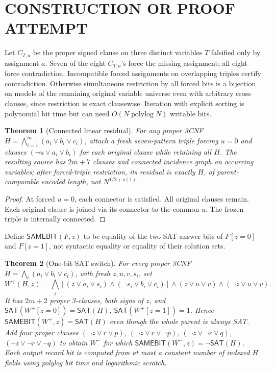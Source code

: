 \documentclass[11pt]{article}
\newtheorem{theorem}{Theorem}
\begin{document}
\section{CONSTRUCTION OR PROOF ATTEMPT}
Let \(C_{T,a}\) be the proper signed clause on three distinct variables \(T\) falsified only by assignment \(a\). Seven of the eight \(C_{T,a}\)'s force the missing assignment; all eight force contradiction. Incompatible forced assignments on overlapping triples certify contradiction. Otherwise simultaneous restriction by all forced bits is a bijection on models of the remaining original variable universe even with arbitrary cross clauses, since restriction is exact clausewise. Iteration with explicit sorting is polynomial bit time but can need \(O(N\operatorname{polylog}N)\) writable bits.
\begin{theorem}[Connected linear residual]
For any proper 3CNF \(H=\bigwedge_{i=1}^m(a_i\vee b_i\vee c_i)\), attach a fresh seven-pattern triple forcing \(u=0\) and clauses \((\neg u\vee a_i\vee b_i)\) for each original clause while retaining all \(H\). The resulting source has \(2m+7\) clauses and connected incidence graph on occurring variables; after forced-triple restriction, its residual is exactly \(H\), of parent-comparable encoded length, not \(N^{1/2+o(1)}\).
\end{theorem}
\begin{proof} At forced \(u=0\), each connector is satisfied. All original clauses remain. Each original clause is joined via its connector to the common \(u\). The frozen triple is internally connected. \end{proof}
Define \(\mathsf{SAMEBIT}(F,z)\) to be equality of the two SAT-answer bits of \(F[z=0]\) and \(F[z=1]\), not syntactic equality or equality of their solution sets.
\begin{theorem}[One-bit SAT switch]
For every proper 3CNF \(H=\bigwedge_i(a_i\vee b_i\vee c_i)\), with fresh \(z,u,v,s_i\), set
\[
 W^+(H,z)=\bigwedge_i[(z\vee a_i\vee s_i)\land(\neg s_i\vee b_i\vee c_i)]
 \land(z\vee u\vee v)\land(\neg z\vee u\vee v).
\]
It has \(2m+2\) proper 3-clauses, both signs of \(z\), and
\(\mathsf{SAT}(W^+[z=0])=\mathsf{SAT}(H)\),
\(\mathsf{SAT}(W^+[z=1])=1\).
Hence \(\mathsf{SAMEBIT}(W^+,z)=\mathsf{SAT}(H)\) even though the whole parent is always SAT. Add four proper clauses
\((\neg z\vee r\vee p)\),
\((\neg z\vee r\vee\neg p)\),
\((\neg z\vee\neg r\vee q)\),
\((\neg z\vee\neg r\vee\neg q)\)
to obtain \(W^-\) for which
\(\mathsf{SAMEBIT}(W^-,z)=\neg\mathsf{SAT}(H)\).
Each output record bit is computed from at most a constant number of indexed \(H\) fields using polylog bit time and logarithmic scratch.
\end{theorem}
\end{document}
